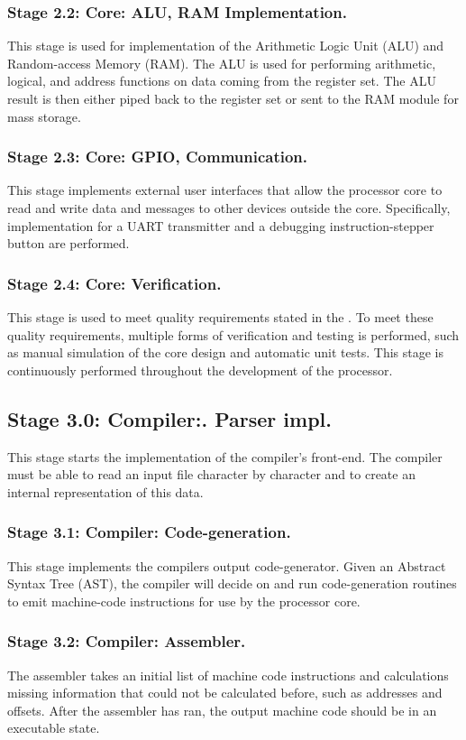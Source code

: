 \documentclass[11pt,a4paper]{report}
\begin{document}
\subsubsection*{Stage 2.2: Core: ALU, RAM Implementation.}
This stage is used for implementation of the Arithmetic Logic Unit (ALU) and Random-access Memory (RAM). The ALU is used for performing arithmetic, logical, and address functions on data coming from the register set. The ALU result is then either piped back to the register set or sent to the RAM module for mass storage.

\subsubsection*{Stage 2.3: Core: GPIO, Communication.}
This stage implements external user interfaces that allow the processor core to read and write data and messages to other devices outside the core. Specifically, implementation for a UART transmitter and a debugging instruction-stepper button are performed.

\subsubsection*{Stage 2.4: Core: Verification.}
This stage is used to meet quality requirements stated in the {}. To meet these quality requirements, multiple forms of verification and testing is performed, such as manual simulation of the core design and automatic unit tests. This stage is continuously performed throughout the development of the processor.

\subsection*{Stage 3.0: Compiler:. Parser impl.}
This stage starts the implementation of the compiler's front-end. The compiler must be able to read an input file character by character and to create an internal representation of this data.

\subsubsection*{Stage 3.1: Compiler: Code-generation.}
This stage implements the compilers output code-generator. Given an Abstract Syntax Tree (AST), the compiler will decide on and run code-generation routines to emit machine-code instructions for use by the processor core.

\subsubsection*{Stage 3.2: Compiler: Assembler.}
The assembler takes an initial list of machine code instructions and calculations missing information that could not be calculated before, such as addresses and offsets. After the assembler has ran, the output machine code should be in an executable state.
\end{document}
